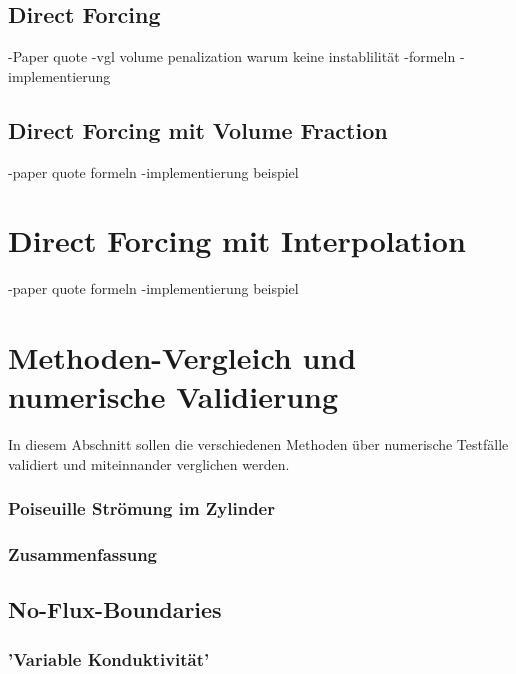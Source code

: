 \subsection{Direct Forcing}
-Paper quote
-vgl volume penalization warum keine instablilität
-formeln
-implementierung

\subsection{Direct Forcing mit Volume Fraction}
-paper quote formeln
-implementierung beispiel

\section{Direct Forcing mit Interpolation}
-paper quote formeln
-implementierung beispiel

\section{Methoden-Vergleich und numerische Validierung}
In diesem Abschnitt sollen die verschiedenen Methoden über numerische Testfälle validiert und miteinnander
verglichen werden.


\subsubsection{Poiseuille Strömung im Zylinder}

\subsubsection{Zusammenfassung}


\subsection{No-Flux-Boundaries}

\subsubsection{'Variable Konduktivität'}











